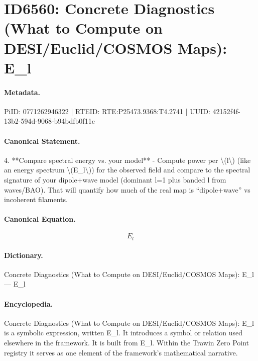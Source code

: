 \section*{ID6560: Concrete Diagnostics (What to Compute on DESI/Euclid/COSMOS Maps): E\_l}
\paragraph{Metadata.}
PiID: 0771262946322 | RTEID: RTE:P25473.9368:T4.2741 | UUID: 42152f4f-13b2-594d-9068-b94bdfb0f11c

\paragraph{Canonical Statement.}
4. **Compare spectral energy vs. your model** - Compute power per \textbackslash{}(l\textbackslash{}) (like an energy spectrum \textbackslash{}(E\_l\textbackslash{})) for the observed field and compare to the spectral signature of your dipole+wave model (dominant l=1 plus banded l from waves/BAO). That will quantify how much of the real map is “dipole+wave” vs incoherent filaments.

\paragraph{Canonical Equation.}
\[
E_l
\]

\paragraph{Dictionary.}
Concrete Diagnostics (What to Compute on DESI/Euclid/COSMOS Maps): E\_l — E\_l

\paragraph{Encyclopedia.}
Concrete Diagnostics (What to Compute on DESI/Euclid/COSMOS Maps): E\_l is a symbolic expression, written E\_l. It introduces a symbol or relation used elsewhere in the framework. It is built from E\_l. Within the Trawin Zero Point registry it serves as one element of the framework's mathematical narrative.
